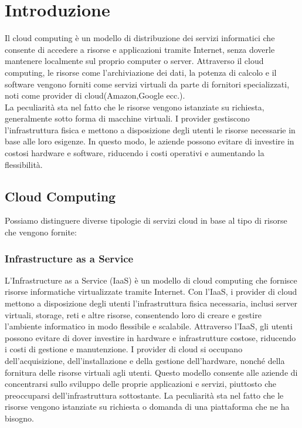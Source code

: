\documentclass[../../main.tex]{subfiles}
\begin{document}
    
\chapter{Introduzione}

Il cloud computing è un modello di distribuzione dei servizi informatici che consente di accedere a risorse e applicazioni tramite Internet, senza doverle mantenere localmente sul proprio computer o server. 
Attraverso il cloud computing, le risorse come l'archiviazione dei dati, la potenza di calcolo e il software vengono forniti come servizi virtuali da parte di fornitori specializzati, noti come provider di cloud(Amazon,Google ecc.).\\
La peculiarità sta nel fatto che le risorse vengono istanziate su richiesta, generalmente sotto forma di macchine virtuali.
I provider gestiscono l'infrastruttura fisica e mettono a disposizione degli utenti le risorse necessarie in base alle loro esigenze. In questo modo, le aziende possono evitare di investire in costosi hardware e software, riducendo i costi operativi e aumentando la flessibilità.

\section{Cloud Computing}
Possiamo distinguere diverse tipologie di servizi cloud in base al tipo di risorse che vengono fornite:
\subsection{Infrastructure as a Service}
L'Infrastructure as a Service (IaaS) è un modello di cloud computing che fornisce risorse informatiche virtualizzate tramite Internet. Con l'IaaS, i provider di cloud mettono a disposizione degli utenti l'infrastruttura fisica necessaria, inclusi server virtuali, storage, reti e altre risorse, consentendo loro di creare e gestire l'ambiente informatico in modo flessibile e scalabile.
Attraverso l'IaaS, gli utenti possono evitare di dover investire in hardware e infrastrutture costose, riducendo i costi di gestione e manutenzione. I provider di cloud si occupano dell'acquisizione, dell'installazione e della gestione dell'hardware, nonché della fornitura delle risorse virtuali agli utenti. Questo modello consente alle aziende di concentrarsi sullo sviluppo delle proprie applicazioni e servizi, piuttosto che preoccuparsi dell'infrastruttura sottostante.
La peculiarità sta nel fatto che le risorse vengono istanziate su richiesta o domanda di una piattaforma che ne ha bisogno.
\end{document}
